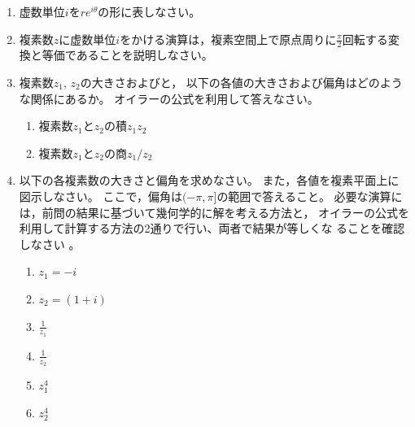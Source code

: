 \documentclass[twocolumn,11pt]{jarticle}
\begin{document}
\begin{enumerate}
\item 虚数単位$i$を$re^{i\theta}$の形に表しなさい。
\item 複素数$z$に虚数単位$i$をかける演算は，複素空間上で原点周りに$\frac{\pi}{2}$回転する変換と等価であることを説明しなさい。
\item 複素数$z_1$, $z_2$の大きさおよびと，
  以下の各値の大きさおよび偏角はどのような関係にあるか。
  オイラーの公式を利用して答えなさい。
  \begin{enumerate}
  \item 複素数$z_1$と$z_2$の積$z_1z_2$
  \item 複素数$z_1$と$z_2$の商$z_1/z_2$
  \end{enumerate}
\item 以下の各複素数の大きさと偏角を求めなさい。
  また，各値を複素平面上に図示しなさい。
  ここで，偏角は$(-\pi,\pi]$の範囲で答えること。
  必要な演算には，前問の結果に基づいて幾何学的に解を考える方法と，
  オイラーの公式を利用して計算する方法の2通りで行い、両者で結果が等しくな
  ることを確認しなさい
  。
  \begin{enumerate}
  \item\label{eitem:z1} $z_1=-i$
  \item\label{eitem:z2} $z_2=(1+i)$
  \item\label{eitem:1/z_1} $\displaystyle\frac{1}{z_1}$
  \item\label{eitem:1/z_2} $\displaystyle\frac{1}{z_2}$
  \item\label{eitem:z_1^4} $z_1^4$
  \item\label{eitem:z_2^4} $z_2^4$

\end{enumerate}
\end{enumerate}
\end{document}
